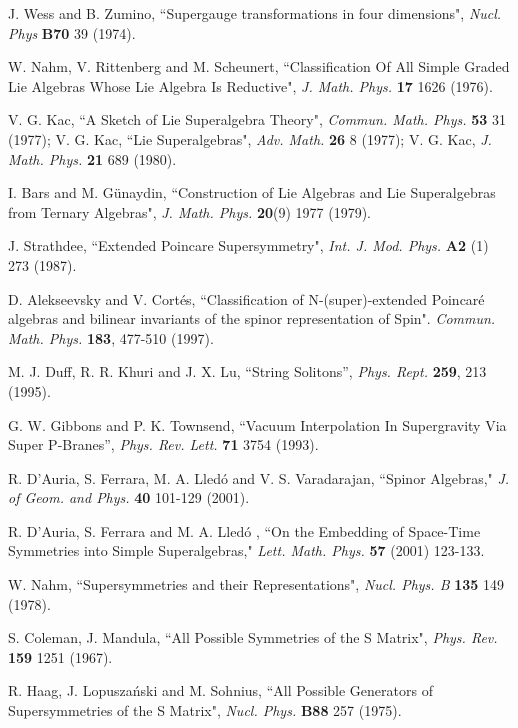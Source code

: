 \documentclass[a4paper,12pt]{article}
\begin{document}
\begin{thebibliography}{99}

 J. Wess and B. Zumino, ``Supergauge transformations
in four dimensions", {\it Nucl. Phys} {\bf B70} 39 (1974).



  W. Nahm, V. Rittenberg and M. Scheunert,
 ``Classification Of All Simple Graded Lie Algebras Whose Lie Algebra Is Reductive",
  {\it J. Math. Phys.} {\bf 17} 1626 (1976).

 V. G. Kac, ``A Sketch of Lie Superalgebra Theory",  {\it Commun. Math. Phys.} {\bf 53} 31 (1977);
V. G. Kac, ``Lie Superalgebras",  {\it Adv. Math. } {\bf 26} 8
(1977); V. G. Kac, {\it J. Math. Phys.} {\bf 21} 689 (1980).

I. Bars and  M. G\"unaydin, ``Construction of
Lie Algebras and Lie Superalgebras from Ternary Algebras",
 {\it J. Math. Phys.} {\bf 20}(9) 1977
 (1979).

  J. Strathdee, ``Extended Poincare Supersymmetry",
 {\it Int. J. Mod. Phys. } {\bf A2} (1) 273 (1987).

    D.  Alekseevsky and V. Cort\'es, ``Classification of N-(super)-extended Poincar\'e
algebras and bilinear invariants of the spinor representation of
Spin\coordHE{}". {\it Commun. Math. Phys.} {\bf 183}, 477-510 (1997).


 M. J. Duff, R. R. Khuri and J. X. Lu,
``String Solitons'', {\it  Phys. Rept.}  {\bf 259}, 213 (1995).

 G. W. Gibbons and P. K. Townsend,
``Vacuum Interpolation In Supergravity Via Super P-Branes'', {\it
Phys.  Rev.  Lett.}  {\bf 71} 3754 (1993).


 R. D'Auria, S. Ferrara,  M. A. Lled\'o and V. S. Varadarajan,
``Spinor Algebras," {\it J. of Geom. and Phys.} {\bf 40} 101-129
(2001).


 R. D'Auria, S. Ferrara and  M. A. Lled\'o , ``On the Embedding of
Space-Time Symmetries into Simple Superalgebras," {\it Lett. Math.
Phys.} {\bf 57} (2001) 123-133.

  W. Nahm, ``Supersymmetries and their Representations",
 {\it Nucl. Phys. B} {\bf 135} 149 (1978).

 S. Coleman, J. Mandula, ``All Possible Symmetries of the S Matrix",
 {\it Phys. Rev.} {\bf 159} 1251 (1967).

  R. Haag, J. Lopusza\'nski and M. Sohnius,
``All Possible Generators of Supersymmetries of the S Matrix",
{\it Nucl. Phys.} {\bf B88} 257 (1975).


\end{thebibliography}
\end{document}
